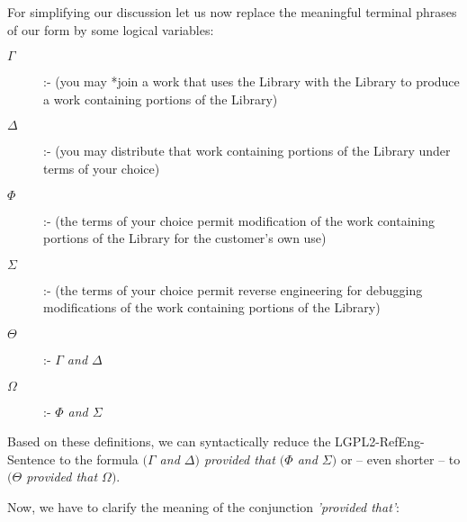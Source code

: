 %
%
%
%
%

For simplifying our discussion let us now replace the meaningful terminal
phrases of our form by some logical variables:

\begin{description}
  \item[$\Gamma$] :- (you may *join a work that uses the Library with the
  Library to produce a work containing portions of the Library) 
  \item[$\Delta$] :- (you may distribute that work containing portions of the
  Library under terms of your choice)
  \item[$\Phi$] :- (the terms of your choice permit modification of the work 
  containing portions of the Library for the customer's own use)
  \item[$\Sigma$] :- (the terms of your choice permit reverse engineering for
  debugging modifications of the work containing portions of the Library)
  \item[$\Theta$] :- \emph{$\Gamma$ and $\Delta$}
  \item[$\Omega$] :- \emph{$\Phi$ and $\Sigma$}
\end{description}

Based on these definitions, we can syntactically reduce the
LGPL2-RefEng-Sentence to the formula \emph{$(\Gamma$ and $\Delta)$ provided that
$(\Phi$ and $\Sigma)$} or -- even shorter -- to \emph{$(\Theta$ provided that
$\Omega)$}.

Now, we have to clarify the meaning of the conjunction \emph{'provided that'}:

